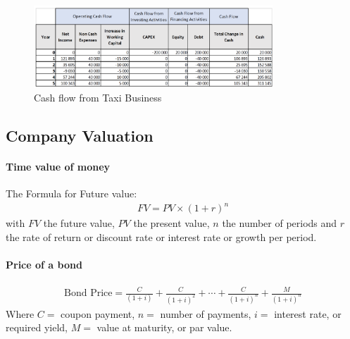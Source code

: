 \begin{figure}[H]
    \centering
    \includegraphics[width=0.8\textwidth]{Pictures/cash_flow_taxi_company.png}
    \caption{Cash flow from Taxi Business}
\end{figure}

\subsection{Company Valuation}

\paragraph{Time value of money}
The Formula for Future value:
\begin{align*}
    FV = PV \times (1+r)^n
\end{align*}
with $FV$ the future value, $PV$ the present value, $n$ the number of periods
and $r$ the rate of return or discount rate or interest rate or growth per period.

\paragraph{Price of a bond}
\begin{align*}
    \text{Bond Price} = \frac{C}{(1+i)} + \frac{C}{(1+i)^2} + \dotsb + \frac{C}{(1+i)^n} + \frac{M}{(1+i)^n}
\end{align*}
Where $C=$ coupon payment, $n=$ number of payments, $i=$ interest rate, or required
yield, $M=$ value at maturity, or par value.

